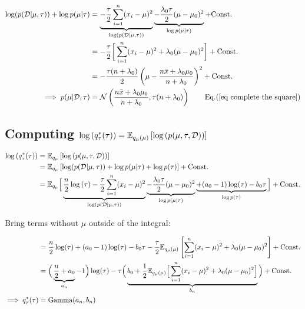 \documentclass{article}
\def\C{\text{Const.}}
\begin{document}
\begin{equation}\begin{split}
\log ( p ( \mathcal{D}| \mu, \tau ) ) + \log p (\mu | \tau)
&=  \underbrace{  - \frac{\tau}{2} \sum_{i=1}^n (x_i - \mu)^2 }_{\log ( p ( \mathcal{D}| \mu, \tau ) )} \underbrace{ -  \frac{\lambda_0 \tau}{2} (\mu - \mu_0)^2}_{\log p (\mu | \tau) }   + \C \\
&= -  \frac{\tau }{2}  \bigg[  \sum_{i=1}^n (x_i - \mu)^2  +  \lambda_0 (\mu - \mu_0)^2  \bigg] + \C \\
&= -  \frac{\tau (n + \lambda_0) }{2}    \left( \mu - \frac{n \bar{x} + \lambda_0 \mu_0}{n + \lambda_0}  \right)^2 + \C \\
\implies p(\mu | \mathcal{D}, \tau) &= \N\left( \frac{n \bar{x} + \lambda_0 \mu_0}{n + \lambda_0 } , \tau (n + \lambda_0) \right)\quad\quad\text{Eq.(\ref{eq complete the square})}\\
\end{split}\end{equation}


\subsection{Computing $\log{ ( q_{\tau}^*(\tau)) } = \mathbb{E}_{q_\mu(\mu)}  \left[ \log{(p(\mu, \tau , \mathcal{D}))} \right]$}

\begin{equation}\begin{split}\label{eq log q tau}
    \log{ ( q_\tau^*(\tau)) } &= \E_{q_\mu}  \left[ \log{(p(\mu, \tau , \mathcal{D}))} \right]\\
&= \E_{q_\mu}  \left[ \log ( p ( \mathcal{D}| \mu, \tau ) ) +  \log p (\mu | \tau) + \log p ( \tau)   \right] + \C \\
&= \E_{q_\mu}  \Big[ \underbrace{ \frac{n}{2 }  \log \left( \tau \right) - \frac{\tau}{2} \sum_{i=1}^n (x_i - \mu)^2 }_{\log ( p ( \mathcal{D}| \mu, \tau ) )} \underbrace{ -  \frac{\lambda_0 \tau}{2} (\mu - \mu_0)^2}_{\log p (\mu | \tau) }  \underbrace{+ (a_0-1) \log (  \tau )  -b_0 \tau}_{\log p ( \tau) }   \Big] + \C \\
\end{split}\end{equation}

Bring terms without $\mu$ outside of the integral:

\begin{equation}\begin{split}
&= \frac{n}{2 }\log ( \tau ) + (a_0-1) \log (  \tau )  -b_0 \tau - \frac{\tau}{2} \E_{q_\mu(\mu)}  \left[   \sum_{i=1}^n (x_i - \mu)^2  +  \lambda_0(\mu - \mu_0)^2 \right] + \C \\
&= \Big(  \underbrace{ \frac{n}{2 } + a_0   }_{a_n}  -1 \Big) \log ( \tau )  - \tau \Big( \underbrace{ b_0  + \frac{1}{2} \E_{q_\mu(\mu)}  \Big[   \sum_{i=1}^n (x_i - \mu)^2  +  \lambda_0(\mu - \mu_0)^2 \Big] }_{b_n} \Big)+ \C \\
\implies q_\tau^*(\tau) &= \text{Gamma}(a_n, b_n)
\end{split}\end{equation}
\end{document}
